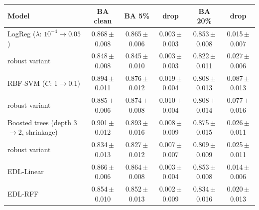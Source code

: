 \begin{tabular}{lccccc}\toprule
Model & BA clean & BA 5\% & drop & BA 20\% & drop\\\midrule
LogReg ($\lambda$: $10^{-4}\!\to\!0.05$) & 0.868\,{\scriptsize$\pm$0.008} & 0.865\,{\scriptsize$\pm$0.006} & 0.003\,{\scriptsize$\pm$0.003} & 0.853\,{\scriptsize$\pm$0.008} & 0.015\,{\scriptsize$\pm$0.007}\\
\quad robust variant & 0.848\,{\scriptsize$\pm$0.008} & 0.845\,{\scriptsize$\pm$0.010} & 0.003\,{\scriptsize$\pm$0.003} & 0.822\,{\scriptsize$\pm$0.011} & 0.027\,{\scriptsize$\pm$0.006}\\
RBF-SVM ($C$: 1$\to$0.1) & 0.894\,{\scriptsize$\pm$0.011} & 0.876\,{\scriptsize$\pm$0.012} & 0.019\,{\scriptsize$\pm$0.004} & 0.808\,{\scriptsize$\pm$0.013} & 0.087\,{\scriptsize$\pm$0.013}\\
\quad robust variant & 0.885\,{\scriptsize$\pm$0.006} & 0.874\,{\scriptsize$\pm$0.008} & 0.010\,{\scriptsize$\pm$0.004} & 0.808\,{\scriptsize$\pm$0.014} & 0.077\,{\scriptsize$\pm$0.016}\\
Boosted trees (depth 3$\to$2, shrinkage) & 0.901\,{\scriptsize$\pm$0.012} & 0.893\,{\scriptsize$\pm$0.016} & 0.008\,{\scriptsize$\pm$0.009} & 0.875\,{\scriptsize$\pm$0.015} & 0.026\,{\scriptsize$\pm$0.011}\\
\quad robust variant & 0.834\,{\scriptsize$\pm$0.013} & 0.827\,{\scriptsize$\pm$0.012} & 0.007\,{\scriptsize$\pm$0.007} & 0.809\,{\scriptsize$\pm$0.009} & 0.025\,{\scriptsize$\pm$0.011}\\
EDL-Linear & 0.866\,{\scriptsize$\pm$0.006} & 0.864\,{\scriptsize$\pm$0.008} & 0.003\,{\scriptsize$\pm$0.004} & 0.853\,{\scriptsize$\pm$0.008} & 0.014\,{\scriptsize$\pm$0.006}\\
EDL-RFF & 0.854\,{\scriptsize$\pm$0.010} & 0.852\,{\scriptsize$\pm$0.013} & 0.002\,{\scriptsize$\pm$0.009} & 0.834\,{\scriptsize$\pm$0.016} & 0.020\,{\scriptsize$\pm$0.013}\\
\bottomrule\end{tabular}